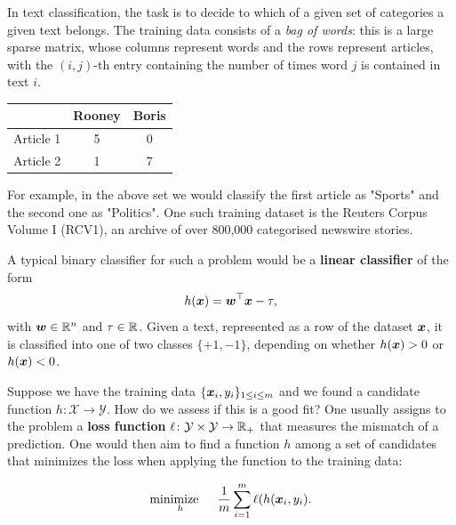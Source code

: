 \begin{example}
In text classification, the task is to decide to which of a given set of categories a given text belongs. The training data consists of a {\em bag of words}: this is a large sparse matrix, whose
columns represent words and the rows represent articles, with the $(i,j)$-th entry containing the number of times word $j$ is contained in text $i$. 

\begin{center}
\begin{tabular}{|r|c|c|}
 & Rooney & Boris \\
\hline 
 Article 1 & 5 & 0 \\
 Article 2 & 1 & 7 \\
\end{tabular}
\end{center}

For example, in the above set we would classify the first article as "Sports" and the second one as "Politics". One such training dataset is the
Reuters Corpus Volume I (RCV1), an archive of over 800,000 categorised newswire stories.

A typical binary classifier for such a problem would be a \textbf{linear classifier} of the form
\begin{equation*}
  h(\bm{x}) = \bm{w}^{\top}\bm{x}-\tau,
\end{equation*} 
with $\bm{w}\in \mathbb{R}^n$ and $\tau\in \mathbb{R}$. Given a text, represented as a row of the dataset $\bm{x}$, it is classified into one of two classes $\{+1,-1\}$, depending on whether $h(\bm{x})>0$ or $h(\bm{x})<0$. 
\end{example}

Suppose we have the training data $\{\bm{x}_i,y_i\}_{1\leq i\leq m}$ and we found a candidate function $h\colon \mathcal{X}\to \mathcal{Y}$. How do we assess if this is a good fit? One usually assigns to the problem a \textbf{loss function} $\ell\colon \mathcal{Y}\times \mathcal{Y}\to \mathbb{R}_+$ that measures the mismatch of a prediction. One would then aim to find a function $h$ among a set of candidates that minimizes the loss when applying the function to the training data:

\begin{equation*}
  \mathop{\text{minimize}\quad}_{h} \ \frac{1}{m} \sum_{i=1}^m \ell(h(\bm{x}_i,y_i).
\end{equation*}


